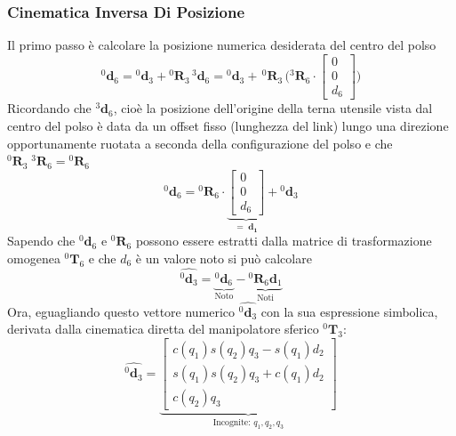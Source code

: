 \documentclass[11pt, a4paper]{report}
\begin{document}
\subsubsection*{Cinematica Inversa Di Posizione}
Il primo passo è calcolare la posizione numerica desiderata del centro del polso
\[
    {}^{0}\mathbf{d}_{6} = {}^{0}\mathbf{d}_{3} + {}^0\mathbf{R}_3 \, {}^{3}\mathbf{d}_{6} = {}^{0}\mathbf{d}_{3} + \, {}^0\mathbf{R}_3 \, \biggl({}^3\mathbf{R}_6 \cdot \begin{bmatrix} 0\\ 0\\ d_{6} \end{bmatrix}\biggr)
\]
Ricordando che \({}^{3}\mathbf{d}_{6}\), cioè la posizione dell'origine della terna utensile vista dal centro del polso è data da un offset fisso (lunghezza del link) lungo una direzione opportunamente ruotata a seconda della configurazione del polso e che \({}^0\mathbf{R}_3 \; {}^3\mathbf{R}_6 = {}^0\mathbf{R}_6\)
\[
    {}^{0}\mathbf{d}_{6} = {}^0\mathbf{R}_6 \cdot \underbrace{\begin{bmatrix} 0\\ 0\\ d_{6} \end{bmatrix}}_{= \;\mathbf{d_{1}}} + {}^{0}\mathbf{d}_{3}
\]
Sapendo che \({}^{0}\mathbf{d}_{6}\) e \({}^{0}\mathbf{R}_{6}\) possono essere estratti dalla matrice di trasformazione omogenea \({}^{0}\mathbf{T}_{6}\) e che \(d_{6}\) è un valore noto si può calcolare
\[
    \boxed{
        \hat{{}^{0}\mathbf{d}_{3}} = \underbrace{{}^{0}\mathbf{d}_{6}}_{\text{Noto}} - \underbrace{{}^{0}\mathbf{R}_{6}\mathbf{d}_1}_{\text{Noti}}
    }
\]
Ora, eguagliando questo vettore numerico \(\hat{{}^{0}\mathbf{d}_{3}}\) con la sua espressione simbolica, derivata dalla cinematica diretta del manipolatore sferico \({}^{0}\mathbf{T}_{3}\):
\[
    \hat{^{0}\mathbf{d}_{3}} =
    \underbrace{
    \begin{bmatrix}
        c(q_{1})s(q_{2})q_{3} - s(q_{1})d_{2}\\
        s(q_{1})s(q_{2})q_{3} + c(q_{1})d_{2}\\
        c(q_{2})q_{3}
    \end{bmatrix}
    }_{\text{Incognite: } q_1, q_2, q_3}
\]
\end{document}
